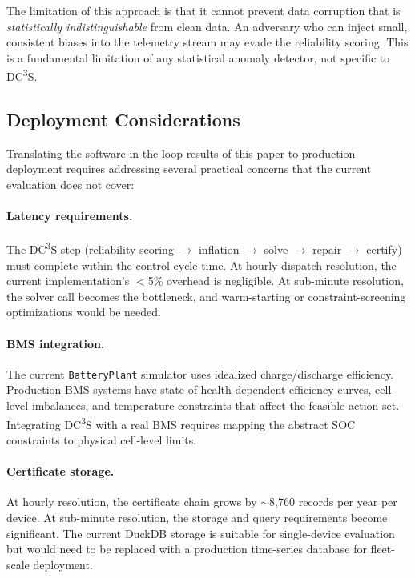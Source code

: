 \documentclass[11pt,a4paper]{article}
\begin{document}
The limitation of this approach is that it cannot prevent data corruption that is \emph{statistically indistinguishable} from clean data. An adversary who can inject small, consistent biases into the telemetry stream may evade the reliability scoring. This is a fundamental limitation of any statistical anomaly detector, not specific to DC\textsuperscript{3}S.

\subsection{Deployment Considerations}

Translating the software-in-the-loop results of this paper to production deployment requires addressing several practical concerns that the current evaluation does not cover:

\paragraph{Latency requirements.} The DC\textsuperscript{3}S step (reliability scoring $\to$ inflation $\to$ solve $\to$ repair $\to$ certify) must complete within the control cycle time. At hourly dispatch resolution, the current implementation's $<$5\% overhead is negligible. At sub-minute resolution, the solver call becomes the bottleneck, and warm-starting or constraint-screening optimizations would be needed.

\paragraph{BMS integration.} The current \texttt{BatteryPlant} simulator uses idealized charge/discharge efficiency. Production BMS systems have state-of-health-dependent efficiency curves, cell-level imbalances, and temperature constraints that affect the feasible action set. Integrating DC\textsuperscript{3}S with a real BMS requires mapping the abstract SOC constraints to physical cell-level limits.

\paragraph{Certificate storage.} At hourly resolution, the certificate chain grows by $\sim$8{,}760 records per year per device. At sub-minute resolution, the storage and query requirements become significant. The current DuckDB storage is suitable for single-device evaluation but would need to be replaced with a production time-series database for fleet-scale deployment.
\end{document}
